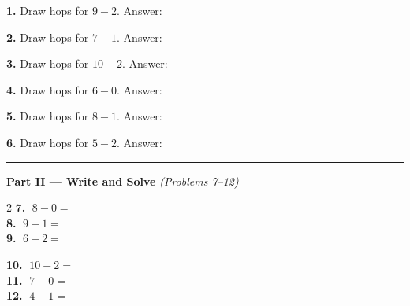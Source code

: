 \documentclass[12pt, letterpaper]{article}
\newcommand{\answerline}{\underline{\hspace{2.5cm}}}
\newcommand{\numbox}{\fbox{\hspace{0.6cm}\vphantom{0}}}
\begin{document}
\bigskip
\noindent\textbf{1.} Draw hops for $9 - 2$. Answer: \hfill \answerline

\bigskip
\noindent\textbf{2.} Draw hops for $7 - 1$. Answer: \hfill \answerline

\bigskip
\noindent\textbf{3.} Draw hops for $10 - 2$. Answer: \hfill \answerline

\bigskip
\noindent\textbf{4.} Draw hops for $6 - 0$. Answer: \hfill \answerline

\bigskip
\noindent\textbf{5.} Draw hops for $8 - 1$. Answer: \hfill \answerline

\bigskip
\noindent\textbf{6.} Draw hops for $5 - 2$. Answer: \hfill \answerline

\bigskip
\noindent\textcolor{scholared}{\rule{\linewidth}{0.4pt}}

\noindent\textcolor{scholared}{\large\textbf{Part II — Write and Solve}} \hfill \textit{(Problems 7–12)}

\bigskip
\begin{multicols}{2}
\noindent\textbf{7.} $\; 8 - 0 = $ \numbox \\[10pt]
\noindent\textbf{8.} $\; 9 - 1 = $ \numbox \\[10pt]
\noindent\textbf{9.} $\; 6 - 2 = $ \numbox

\columnbreak

\noindent\textbf{10.} $\; 10 - 2 = $ \numbox \\[10pt]
\noindent\textbf{11.} $\; 7 - 0 = $ \numbox \\[10pt]
\noindent\textbf{12.} $\; 4 - 1 = $ \numbox
\end{multicols}
\end{document}
